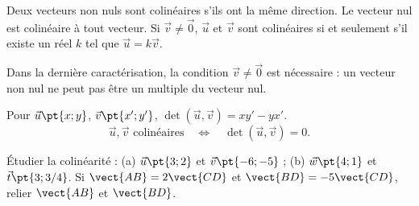 \begin{keypoint}[Définition]
Deux vecteurs non nuls sont colinéaires s'ils ont la même direction. Le vecteur nul est colinéaire à tout vecteur. Si $\vec v\ne\vec0$, $\vec u$ et $\vec v$ sont colinéaires si et seulement s'il existe un réel $k$ tel que $\vec u=k\vec v$.
\end{keypoint}
\begin{pitfall}Dans la dernière caractérisation, la condition $\vec v\ne\vec0$ est nécessaire : un vecteur non nul ne peut pas être un multiple du vecteur nul.\end{pitfall}
\begin{keypoint}
Pour $\vec u\pt{x;y}$, $\vec v\pt{x';y'}$, $\det(\vec u,\vec v)=xy'-yx'$.
\[\vec u,\vec v\text{ colinéaires}\quad\Longleftrightarrow\quad\det(\vec u,\vec v)=0.\]
\end{keypoint}
\begin{example}Étudier la colinéarité : (a) $\vec u\pt{3;2}$ et $\vec v\pt{-6;-5}$ ; (b) $\vec w\pt{4;1}$ et $\vec t\pt{3;3/4}$. Si $\vect{AB}=2\vect{CD}$ et $\vect{BD}=-5\vect{CD}$, relier $\vect{AB}$ et $\vect{BD}$.\end{example}

